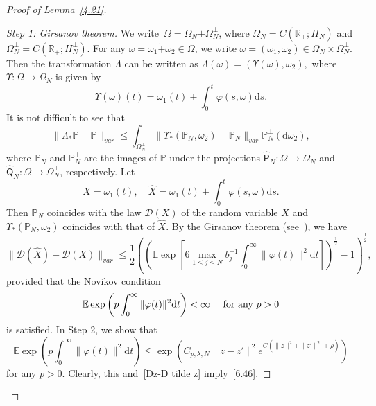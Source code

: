 \documentclass[10pt]{amsart}
\theoremstyle{definition}\newtheorem{defi}[theo]{Definition}\newtheorem{rema}[theo]{Remark}\newtheorem{exam}[theo]{Example}\newtheorem{exem}[theo]{Example}\newtheorem{nota}[theo]{Notation}
\newcommand{\ph}{\varphi}
\newcommand{\R}{{\mathbb R}}
\newcommand{\pP}{{\mathbb P}}
\newcommand{\E}{{\mathbb E}}
\newcommand{\DD}{{\mathcal D}}
\newcommand{\ty}{\infty}
\newcommand{\om}{\omega}
\newcommand{\dt}{\dot}
\newcommand{\dd}{\mathrm{d}}
\newenvironment{step}{\begin{proof}}{\let\qed\relax \end{proof}}
\newenvironment{proofc}[1][\proofname]{\begin{proof}[{#1}]}{\end{proof}}
\begin{document}
\goodbreak
\begin{proofc}[Proof of Lemma~\ref{4.21}]

\begin{step}[Step 1: Girsanov theorem]
We write~$ \Omega=\Omega_N\dt+\Omega_N^{\perp}$, where $\Omega_N=C(\R_+; H_N)$ and $\Omega_N^\perp=C(\R_+; { H^\perp_N})$. For any $\om=\om_{1}\dt+\om_{2}\in \Omega$, we write $\om=(\om_{1},\om_{2})\in \Omega_N\times \Omega_N^{\perp}$. Then the transformation $\Lambda$ can be written as $\Lambda(\om)=(\Upsilon(\omega),\om_{2}), $ where $\Upsilon:\Omega\to\Omega_N$ is given by
\[
\Upsilon(\om)(t)=\om_{1}(t)+\int_0^t \ph(s,\om)\dd s.
\]
It is not difficult to see that
\[
\|\Lambda_*\pP-\pP\|_{var}\leq\int_{\Omega^\perp_N}\|\Upsilon_*(\pP_N,\om_{2})-\pP_N\|_{var}\pP^\perp_N(\dd\om_{2}),
\]
where $\pP_N$ and $\pP^\perp_N$ are the images of $\pP$ under the projections $\hat {\mathsf P}_N:\Omega\to\Omega_N$ and $\hat {\mathsf Q}_N:\Omega\to\Omega^\perp_N$, respectively. Let
\[
X=\om_{1}(t),\quad
\hat X=\om_{1}(t)+\int_0^t \ph(s,\om)\dd s.
\]
Then $\pP_N$ coincides with the law $\DD(X)$ of the random variable $X$ and~$\Upsilon_*(\pP_N,\om_{2})$ coincides with that of $\hat X$. By the Girsanov theorem (see~\cite[Theorem~A.10.1]{KS-book}), we have
\begin{equation}\label{Dz-D tilde z}
\|\DD(\hat X)-\DD(X)\|_{var}\leq\frac{1}{2}\left(\left(\E\exp\left[6\max_{1\leq j\leq N} b_j^{-1}\int_0^\infty \|\varphi(t)\|^2\dd t\right]\right)^{\frac{1}{2}}-1\right)^{\frac{1}{2}},
\end{equation}
provided that the Novikov condition
\[
\E \exp\left(p\int_0^\ty \|\ph(t)\|^2 \dd t \right)<\infty \quad \text{ for any $ p>0$}
\]
is satisfied. In Step 2, we show that
\begin{equation}\label{novikov}
\E \exp\left(p\int_0^\ty \|\ph(t)\|^2 \dd t \right)\le \exp\left(C_{p,\lambda, N} \|z-z'\|^2 e^{C(\|z\|^2+\|z'\|^2+\rho)} \right)
\end{equation}
for any $ p>0$. Clearly, this and~\eqref{Dz-D tilde z} imply~\eqref{6.46}.
\end{step}


\end{proofc}
\end{document}
